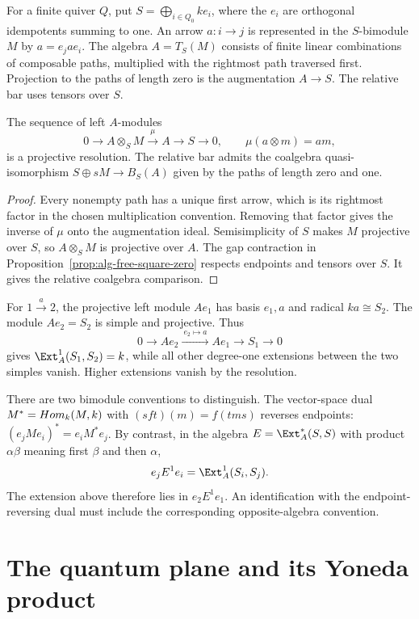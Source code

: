 For a finite quiver $Q$, put $S=\bigoplus_{i\in Q_0}ke_i$, where the $e_i$ are orthogonal idempotents summing to one.
An arrow $a:i\to j$ is represented in the $S$-bimodule $M$ by $a=e_j a e_i$.
The algebra $A=T_S(M)$ consists of finite linear combinations of composable paths, multiplied with the rightmost path traversed first.
Projection to the paths of length zero is the augmentation $A\to S$.
The relative bar uses tensors over $S$.

\begin{proposition}
\label{prop:alg-path-resolution}
The sequence of left $A$-modules
\[
 0\longrightarrow A\otimes_S M
 \xrightarrow{\ \mu\ }A\longrightarrow S\longrightarrow0,
 \qquad \mu(a\otimes m)=am,
\]
is a projective resolution.
The relative bar admits the coalgebra quasi-isomorphism
$S\oplus sM\to B_S(A)$ given by the paths of length zero and one.
\end{proposition}
\begin{proof}
Every nonempty path has a unique first arrow, which is its rightmost factor in the chosen multiplication convention.
Removing that factor gives the inverse of $\mu$ onto the augmentation ideal.
Semisimplicity of $S$ makes $M$ projective over $S$, so $A\otimes_S M$ is projective over $A$.
The gap contraction in Proposition~\ref{prop:alg-free-square-zero} respects endpoints and tensors over $S$.
It gives the relative coalgebra comparison.
\end{proof}

For $1\xrightarrow{a}2$, the projective left module $Ae_1$ has basis $e_1,a$ and radical $ka\cong S_2$.
The module $Ae_2=S_2$ is simple and projective.
Thus
\[
 0\longrightarrow Ae_2\xrightarrow{\ e_2\mapsto a\ }Ae_1
 \longrightarrow S_1\longrightarrow0
\]
gives $\Ext^1_A(S_1,S_2)=k$, while all other degree-one extensions between the two simples vanish.
Higher extensions vanish by the resolution.

There are two bimodule conventions to distinguish.
The vector-space dual $M^*=Hom_k(M,k)$ with $(sft)(m)=f(tms)$ reverses endpoints:
$(e_jMe_i)^*=e_iM^*e_j$.
By contrast, in the algebra $E=\Ext^*_A(S,S)$ with product $\alpha\beta$ meaning first $\beta$ and then $\alpha$,
\[
 e_jE^1e_i=\Ext^1_A(S_i,S_j).
\]
The extension above therefore lies in $e_2E^1e_1$.
An identification with the endpoint-reversing dual must include the corresponding opposite-algebra convention.

\section{The quantum plane and its Yoneda product}

